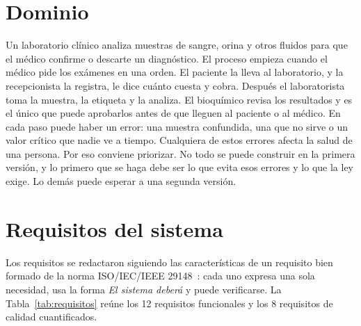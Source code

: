 \documentclass[11pt,a4paper]{article}
\begin{document}
\section{Dominio}
Un laboratorio clínico analiza muestras de sangre, orina y otros fluidos para que el médico confirme o descarte un diagnóstico. El proceso empieza cuando el médico pide los exámenes en una orden. El paciente la lleva al laboratorio, y la recepcionista la registra, le dice cuánto cuesta y cobra. Después el laboratorista toma la muestra, la etiqueta y la analiza. El bioquímico revisa los resultados y es el único que puede aprobarlos antes de que lleguen al paciente o al médico. En cada paso puede haber un error: una muestra confundida, una que no sirve o un valor crítico que nadie ve a tiempo. Cualquiera de estos errores afecta la salud de una persona. Por eso conviene priorizar. No todo se puede construir en la primera versión, y lo primero que se haga debe ser lo que evita esos errores y lo que la ley exige. Lo demás puede esperar a una segunda versión.

\section{Requisitos del sistema}
Los requisitos se redactaron siguiendo las características de un requisito bien formado de la norma ISO/IEC/IEEE 29148~\cite{iso29148}: cada uno expresa una sola necesidad, usa la forma \emph{El sistema deberá} y puede verificarse. La Tabla~\ref{tab:requisitos} reúne los 12 requisitos funcionales y los 8 requisitos de calidad cuantificados.
\end{document}
